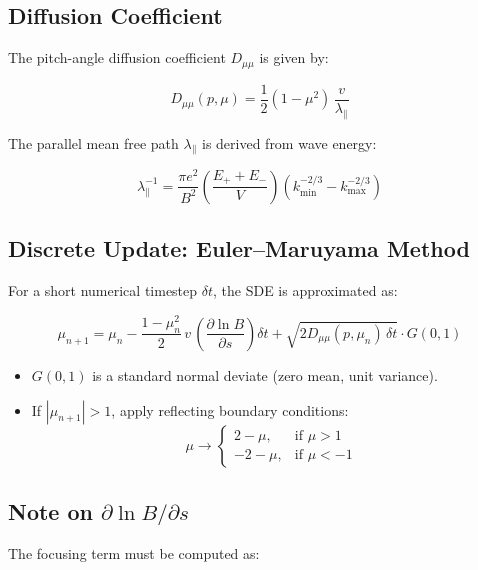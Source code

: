 {\subsection*{Diffusion Coefficient}

The pitch-angle diffusion coefficient $D_{\mu\mu}$ is given by:

\begin{tcolorbox}
\[
\boxed{
D_{\mu\mu}(p,\mu)
= \frac{1}{2} (1 - \mu^2) \, \frac{v}{\lambda_\parallel}
}
\tag{2}\label{eq:Dmumu}
\]
\end{tcolorbox}

\noindent
The parallel mean free path $\lambda_\parallel$ is derived from wave energy:

\begin{tcolorbox}
\[
\boxed{
\lambda_\parallel^{-1}
= \frac{\pi e^2}{B^2}
  \left( \frac{E_+ + E_-}{V} \right)
  \left( k_{\min}^{-2/3} - k_{\max}^{-2/3} \right)
}
\tag{3}
\]
\end{tcolorbox}

\subsection*{Discrete Update: Euler–Maruyama Method}

For a short numerical timestep $\delta t$, the SDE is approximated as:

\begin{tcolorbox}
\[
\mu_{n+1} = \mu_n
- \frac{1 - \mu_n^2}{2} \, v \, \left( \frac{\partial \ln B}{\partial s} \right) \delta t
+ \sqrt{2 D_{\mu\mu}(p, \mu_n) \, \delta t} \cdot G(0,1)
\]
\end{tcolorbox}

\begin{itemize}
  \item $G(0,1)$ is a standard normal deviate (zero mean, unit variance).
  \item If $|\mu_{n+1}| > 1$, apply reflecting boundary conditions:
\[
\mu \to
\begin{cases}
2 - \mu, & \text{if } \mu > 1 \\
-2 - \mu, & \text{if } \mu < -1
\end{cases}
\]
\end{itemize}

\subsection*{Note on $\partial \ln B / \partial s$}

The focusing term must be computed as:

}
